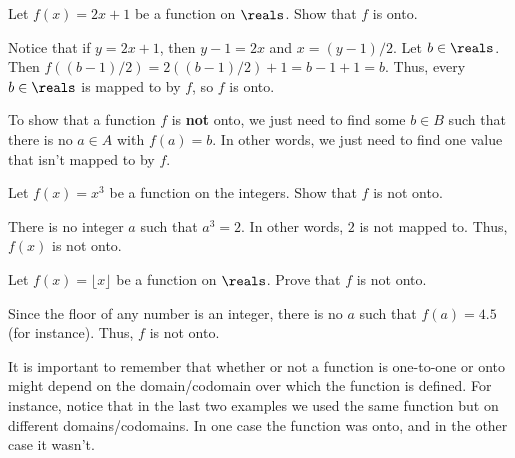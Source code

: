 \begin{exer}
Let $f(x)=2x+1$ be a function on $\reals$.  Show that $f$ is onto.

\noindent
\pflinefour
\begin{answer}
Notice that if $y=2x+1$, then $y-1=2x$ and $x=(y-1)/2$.
Let $b\in\reals$.  Then $f((b-1)/2)=2((b-1)/2)+1 = b-1+1=b$.
Thus, every $b\in\reals$ is mapped to by $f$, so $f$ is onto.
\end{answer}
\end{exer}

\begin{proc}
To show that a function $f$ is {\bf not} onto, we just need to find some $b\in B$ such that there is no
$a\in A$ with $f(a)=b$.  In other words, we just need to find one value that isn't mapped to by $f$.
\end{proc}

\begin{exa}
Let $f(x)=x^3$ be a function on the integers.  Show that $f$ is not onto.
\begin{sol}
There is no integer $a$ such that $a^3=2$.  In other words, $2$ is not mapped to.
Thus, $f(x)$ is not onto.
\end{sol}
\end{exa}

\begin{exer}
Let $f(x)=\lfloor x \rfloor$ be a function on $\reals$.  Prove that $f$ is not onto.

\noindent
\pflinetwo
\begin{answer}
Since the floor of any number is an integer, there is no $a$ such that $f(a)=4.5$ (for instance).
Thus, $f$ is not onto.
\end{answer}
\end{exer}

It is important to remember that whether or not a function is one-to-one or onto might depend
on the domain/codomain over which the function is defined.
For instance, notice that in the last two examples we used the same function but on different domains/codomains.
In one case the function was onto, and in the other case it wasn't.

